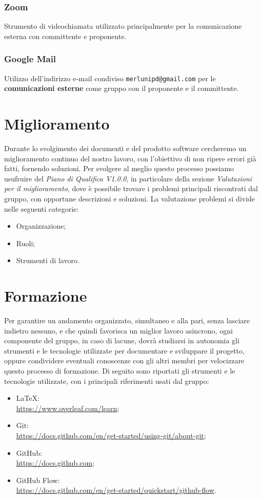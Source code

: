 \subsubsection{Zoom}
Strumento di videochiamata utilizzato principalmente per la comunicazione esterna con committente e proponente.

\subsubsection{Google Mail}
Utilizzo dell'indirizzo e-mail condiviso \texttt{merlunipd@gmail.com} per le \textbf{comunicazioni esterne} come gruppo con il proponente e il committente.

\section{Miglioramento}
Durante lo svolgimento dei documenti e del prodotto software cercheremo un miglioramento continuo del nostro lavoro, con l'obiettivo di non ripere errori già fatti, fornendo soluzioni. Per svolgere al meglio questo processo possiamo usufruire del \textit{Piano di Qualifica V1.0.0}, in particolare della sezione \textit{Valutazioni per il miglioramento}, dove è possibile trovare i problemi principali riscontrati dal gruppo, con opportune descrizioni e soluzioni. La valutazione problemi si divide nelle seguenti categorie:
\begin{itemize}
  \item Organizzazione;
  \item Ruoli;
  \item Strumenti di lavoro.
\end{itemize}

\section{Formazione}
Per garantire un andamento organizzato, simultaneo e alla pari, senza lasciare indietro nessuno, e che quindi favorisca un miglior lavoro
asincrono, ogni componente del gruppo, in caso di lacune, dovrà studiarsi in autonomia gli strumenti e le tecnologie utilizzate per documentare e sviluppare
il progetto, oppure condividere eventuali conoscenze con gli altri membri per velocizzare questo processo di formazione.
\newline
Di seguito sono riportati gli strumenti e le tecnologie utilizzate, con i principali riferimenti usati dal gruppo:
\begin{itemize}
    \item LaTeX:\\ \url{https://www.overleaf.com/learn};
    \item Git:\\ \url{https://docs.github.com/en/get-started/using-git/about-git};
    \item GitHub:\\ \url{https://docs.github.com};
    \item GitHub Flow:\\ \url{https://docs.github.com/en/get-started/quickstart/github-flow}.
\end{itemize}
